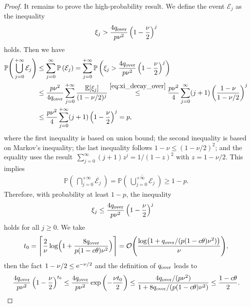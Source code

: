 \documentclass[11pt]{article}
\theoremstyle{plain}
\theoremstyle{definition}
\theoremstyle{remark}
\theoremstyle{plain}
\def\fE{{\mathcal{E}}}
\def\OM{{\mathcal O}}
\begin{document}
\begin{proof}
It remains to prove the high-probability result.
We define the event $\fE_j$ as the inequality
\begin{align*}
    \xi_j>\frac{4q_{\text{\rm over}}}{p\nu^2}
\left(1-\frac{\nu}{2}\right)^j
\end{align*}
holds. Then we have
\begin{align*}
\mathbb P\Bigg(\bigcup_{j=0}^{+\infty}\fE_j\Bigg)
& \leq \sum_{j=0}^{\infty}\mathbb P\left(\fE_j\right) = \sum_{j=0}^{+\infty}\mathbb P\left(\xi_j>\frac{4q_{\text{\rm over}}}{p\nu^2}
\left(1-\frac{\nu}{2}\right)^j\right) \\
& \leq
\frac{p\nu^2}{4q_{\text{\rm over}}}
\sum_{j=0}^{+\infty}\frac{\mathbb E[\xi_j]}{(1-\nu/2)^j}\overset{\eqref{eq:xi_decay_over}}{\leq}
\frac{p\nu^2}{4}\sum_{j=0}^{\infty}(j+1)
\left(\frac{1-\nu}{1-\nu/2}\right)^j\\
& \leq\frac{p\nu^2}{4}\sum_{j=0}^{+\infty}(j+1)
\left(1-\frac{\nu}{2}\right)^j=p,
\end{align*}
where the first inequality is based on union bound;
the second inequality is based on Markov's inequality; 
the last inequality follows $1-\nu\leq(1-\nu/2)^2$;
and the equality uses the result~$\sum_{j=0}^{\infty}(j+1)z^j=1/(1-z)^2$ with $z=1-\nu/2$.
This implies
\begin{align*}
\mathbb P\left(~\bigcap_{j=0}^{+\infty}\overline{\fE_j}~\right) 
=\mathbb P\left(~\overline{\bigcup_{j=0}^{+\infty}\fE_j}~\right) \geq 1-p.
\end{align*}
Therefore, with probability at least $1-p$, the inequality
\begin{align}
\label{eq:xi_j_union_bound}
\xi_j
&\leq\frac{4q_{\text{\rm over}}}{p\nu^2}
\left(1-\frac{\nu}{2}\right)^j
\end{align}
holds for all $j\geq0$.
We take
\begin{align*}
t_0
=\Biggl\lceil
\frac{2}{\nu}
\log\Bigl(1+\frac{8q_{\text{\rm over}}}{p(1-c\theta)\nu^2}\Bigr)
\Biggr\rceil
=\OM\Biggl(\frac{\log\bigl(1+q_{\text{\rm over}}/(p(1-c\theta)\nu^2)\bigr)}{\nu}\Biggr),
\end{align*}
then the fact $1-\nu/2\leq{\rm e}^{-\nu/2}$ and the definition of $q_{\rm over}$ leads to
\begin{align}
\label{eq:qover_phase_bound}
\frac{4q_{\text{\rm over}}}{p\nu^2}
\left(1-\frac{\nu}{2}\right)^{t_0}
\leq\frac{4q_{\text{\rm over}}}{p\nu^2}
\exp\left(-\frac{\nu t_0}{2}\right)
\leq\frac{4q_{\text{\rm over}}/(p\nu^2)}
{1+8q_{\text{\rm over}}/(p(1-c\theta)\nu^2)}
\leq\frac{1-c\theta}{2}.
\end{align}

\end{proof}
\end{document}
